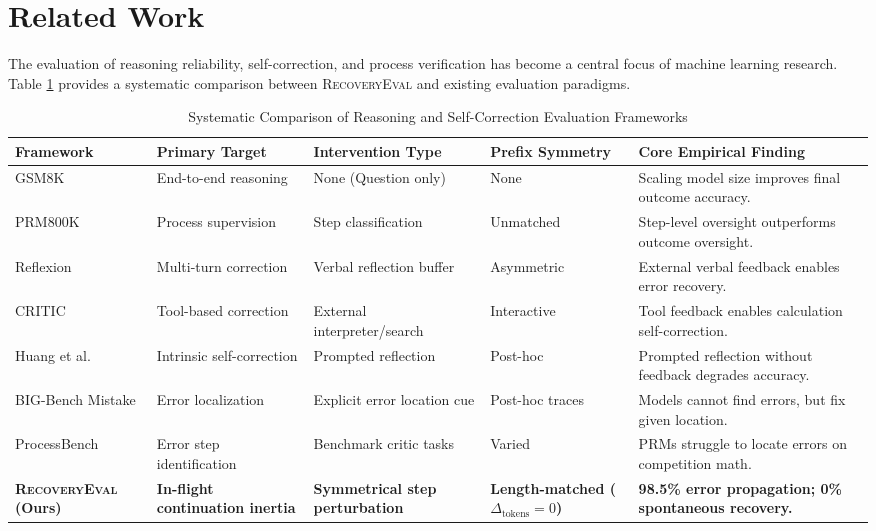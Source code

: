 \documentclass[11pt,letterpaper]{article}
\newcommand{\framework}{\textsc{RecoveryEval}}
\begin{document}
\section{Related Work}

The evaluation of reasoning reliability, self-correction, and process verification has become a central focus of machine learning research. Table \ref{tab:literature} provides a systematic comparison between \framework{} and existing evaluation paradigms.

\begin{table}[t]
\centering
\small
\caption{Systematic Comparison of Reasoning and Self-Correction Evaluation Frameworks}
\label{tab:literature}
\begin{tabularx}{\textwidth}{p{3.2cm}p{2.8cm}p{3.0cm}p{2.4cm}X}
\toprule
\textbf{Framework} & \textbf{Primary Target} & \textbf{Intervention Type} & \textbf{Prefix Symmetry} & \textbf{Core Empirical Finding} \\
\midrule
GSM8K \cite{cobbe2021gsm8k} & End-to-end reasoning & None (Question only) & None & Scaling model size improves final outcome accuracy. \\
PRM800K \cite{lightman2023process} & Process supervision & Step classification & Unmatched & Step-level oversight outperforms outcome oversight. \\
Reflexion \cite{shinn2023reflexion} & Multi-turn correction & Verbal reflection buffer & Asymmetric & External verbal feedback enables error recovery. \\
CRITIC \cite{gou2024critic} & Tool-based correction & External interpreter/search & Interactive & Tool feedback enables calculation self-correction. \\
Huang et al. \cite{huang2023large} & Intrinsic self-correction & Prompted reflection & Post-hoc & Prompted reflection without feedback degrades accuracy. \\
BIG-Bench Mistake \cite{tyen2024bigbenchmistake} & Error localization & Explicit error location cue & Post-hoc traces & Models cannot find errors, but fix given location. \\
ProcessBench \cite{zheng2024processbench} & Error step identification & Benchmark critic tasks & Varied & PRMs struggle to locate errors on competition math. \\
\midrule
\textbf{\framework{} (Ours)} & \textbf{In-flight continuation inertia} & \textbf{Symmetrical step perturbation} & \textbf{Length-matched ($\Delta_{\text{tokens}}=0$)} & \textbf{98.5\% error propagation; 0\% spontaneous recovery.} \\
\bottomrule
\end{tabularx}
\end{table}
\end{document}
